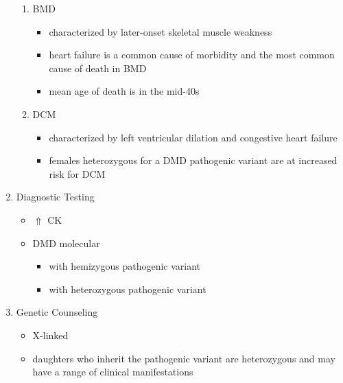 \documentclass[12pt]{scrartcl}
\begin{document}
\begin{enumerate}
\begin{enumerate}
\item BMD
\label{sec:org41c05ca}
\begin{itemize}
\item characterized by later-onset skeletal muscle weakness
\item heart failure is a common cause of morbidity and the most common
cause of death in BMD
\item mean age of death is in the mid-40s
\end{itemize}
\item DCM
\label{sec:orgcd593d6}
\begin{itemize}
\item characterized by left ventricular dilation and congestive heart
failure
\item females heterozygous for a DMD pathogenic variant are at increased
risk for DCM
\end{itemize}
\end{enumerate}
\item Diagnostic Testing
\label{sec:org0fcd87f}
\begin{itemize}
\item \(\Uparrow\) CK
\item DMD molecular
\begin{itemize}
\item \male with hemizygous pathogenic variant
\item \female with heterozygous pathogenic variant
\end{itemize}
\end{itemize}
\item Genetic Counseling
\label{sec:org5fa5e47}
\begin{itemize}
\item X-linked
\item daughters who inherit the pathogenic variant are heterozygous and
may have a range of clinical manifestations
\end{itemize}
\end{enumerate}
\end{document}
